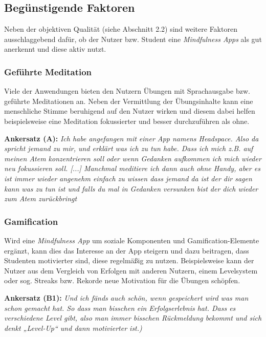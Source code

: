 \documentclass[10pt]{article}
\begin{document}
\subsection{Begünstigende Faktoren}
Neben der objektiven Qualität (siehe Abschnitt 2.2) sind weitere Faktoren ausschlaggebend dafür, ob der Nutzer bzw. Student eine \textit{Mindfulness Apps} als gut anerkennt und diese aktiv nutzt. 

\subsubsection{Geführte Meditation}
\medskip
Viele der Anwendungen bieten den Nutzern Übungen mit Sprachausgabe bzw. geführte Meditationen an. Neben der Vermittlung der Übungsinhalte kann eine menschliche Stimme beruhigend auf den Nutzer wirken und diesem dabei helfen beispielsweise eine Meditation fokussierter und besser durchzuführen als ohne.  

\medskip
\textbf{Ankersatz (A):}
\newline
\grqq\textit{Ich habe angefangen mit einer App namens Headspace. Also da spricht jemand zu mir, und erklärt was ich zu tun habe. Dass ich mich z.B. auf meinen Atem konzentrieren soll oder wenn Gedanken aufkommen ich mich wieder neu fokussieren soll. [...] Manchmal meditiere ich dann auch ohne Handy, aber es ist immer wieder angenehm einfach zu wissen dass jemand da ist der dir sagen kann was zu tun ist und falls du mal in Gedanken versunken bist der dich wieder zum Atem zurückbringt}\grqq\

\medskip

\subsubsection{Gamification}
Wird eine \textit{Mindfulness App} um soziale Komponenten und Gamification-Elemente ergänzt, kann dies das Interesse an der App steigern und dazu beitragen, dass Studenten motivierter sind, diese regelmäßig zu nutzen. 
Beispielsweise kann der Nutzer aus dem Vergleich von Erfolgen mit anderen Nutzern, einem Levelsystem oder sog. Streaks bzw. Rekorde neue Motivation für die Übungen schöpfen.

\medskip
\textbf{Ankersatz (B1):}
\newline
\grqq\textit{Und ich fänds auch schön, wenn gespeichert wird was man schon gemacht hat. So dass man bisschen ein Erfolgserlebnis hat. Dass es verschiedene Level gibt, also man immer bisschen Rückmeldung bekommt und sich denkt „Level-Up“ und dann motivierter ist.)}\grqq\
\end{document}
